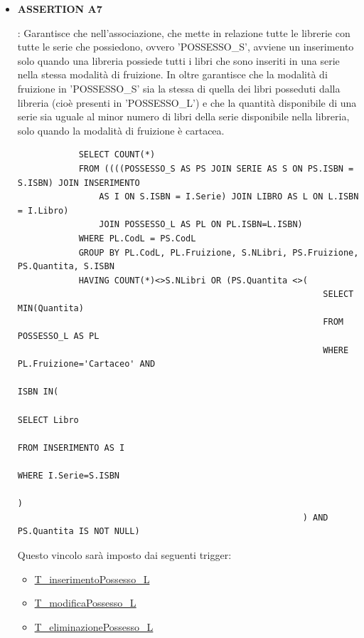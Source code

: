 \documentclass{article}
\begin{document}
\begin{itemize}
    \item \hypertarget{assertion7}{\textbf{ASSERTION A7}}: Garantisce che nell'associazione, che mette in relazione tutte le librerie con tutte le serie che possiedono, ovvero 'POSSESSO\_S', avviene un inserimento solo quando una libreria possiede tutti i libri che sono inseriti in una serie nella stessa modalità di fruizione. In oltre garantisce che la modalità di fruizione in 'POSSESSO\_S' sia la stessa di quella dei libri posseduti dalla libreria (cioè presenti in 'POSSESSO\_L') e che la quantità disponibile di una serie sia uguale al minor numero di libri della serie disponibile nella libreria, solo quando la modalità di fruizione è cartacea.
    \newpage
        \begin{verbatim}
            SELECT COUNT(*)
            FROM ((((POSSESSO_S AS PS JOIN SERIE AS S ON PS.ISBN = S.ISBN) JOIN INSERIMENTO
                AS I ON S.ISBN = I.Serie) JOIN LIBRO AS L ON L.ISBN = I.Libro) 
                JOIN POSSESSO_L AS PL ON PL.ISBN=L.ISBN)
            WHERE PL.CodL = PS.CodL
            GROUP BY PL.CodL, PL.Fruizione, S.NLibri, PS.Fruizione, PS.Quantita, S.ISBN
            HAVING COUNT(*)<>S.NLibri OR (PS.Quantita <>(
                                                            SELECT MIN(Quantita)
                                                            FROM POSSESSO_L AS PL
                                                            WHERE PL.Fruizione='Cartaceo' AND 
                                                                ISBN IN(
                                                                        SELECT Libro
                                                                        FROM INSERIMENTO AS I
                                                                        WHERE I.Serie=S.ISBN
                                                                    )      
                                                        ) AND PS.Quantita IS NOT NULL)                    
        \end{verbatim}
    Questo vincolo sarà imposto dai seguenti trigger:
        \begin{itemize}
            \item \hyperlink{t18}{T\_inserimentoPossesso\_L}
            \item \hyperlink{t19}{T\_modificaPossesso\_L}
            \item \hyperlink{t20}{T\_eliminazionePossesso\_L}
        \end{itemize}  
\end{itemize}
\end{document}
